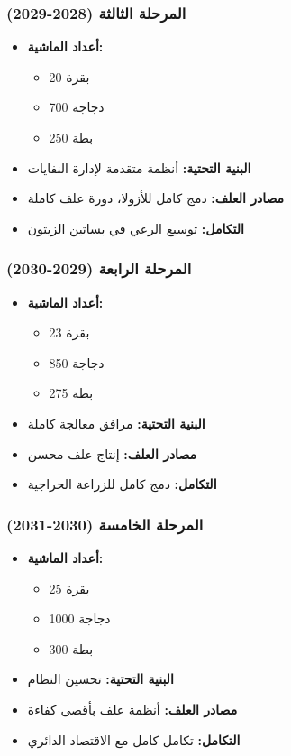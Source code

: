 \subsubsection{المرحلة الثالثة (2028-2029)}
\begin{itemize}
    \item \textbf{أعداد الماشية:}
    \begin{itemize}
        \item 20 بقرة
        \item 700 دجاجة
        \item 250 بطة
    \end{itemize}
    \item \textbf{البنية التحتية:} أنظمة متقدمة لإدارة النفايات
    \item \textbf{مصادر العلف:} دمج كامل للأزولا، دورة علف كاملة
    \item \textbf{التكامل:} توسيع الرعي في بساتين الزيتون
\end{itemize}

\subsubsection{المرحلة الرابعة (2029-2030)}
\begin{itemize}
    \item \textbf{أعداد الماشية:}
    \begin{itemize}
        \item 23 بقرة
        \item 850 دجاجة
        \item 275 بطة
    \end{itemize}
    \item \textbf{البنية التحتية:} مرافق معالجة كاملة
    \item \textbf{مصادر العلف:} إنتاج علف محسن
    \item \textbf{التكامل:} دمج كامل للزراعة الحراجية
\end{itemize}

\subsubsection{المرحلة الخامسة (2030-2031)}
\begin{itemize}
    \item \textbf{أعداد الماشية:}
    \begin{itemize}
        \item 25 بقرة
        \item 1000 دجاجة
        \item 300 بطة
    \end{itemize}
    \item \textbf{البنية التحتية:} تحسين النظام
    \item \textbf{مصادر العلف:} أنظمة علف بأقصى كفاءة
    \item \textbf{التكامل:} تكامل كامل مع الاقتصاد الدائري
\end{itemize}
